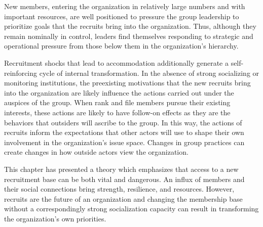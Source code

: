 New members, entering the organization in relatively large numbers and with important resources, are well positioned to pressure the group leadership to prioritize goals that the recruits bring into the organization.  Thus, although they remain nominally in control, leaders find themselves responding to strategic and operational pressure from those below them in the organization's hierarchy. 

Recruitment shocks that lead to accommodation additionally generate a self-reinforcing cycle of internal transformation. In the absence of strong socializing or monitoring institutions, the preexisting motivations that the new recruits bring into the organization are likely influence the actions carried out under the auspices of the group.  When rank and file members pursue their existing interests, these actions are likely to have follow-on effects as they are the behaviors that outsiders will ascribe to the group.  In this way, the actions of recruits inform the expectations that other actors will use to shape their own involvement in the organization's issue space.  Changes in group practices can create changes in how outside actors view the organization.

This chapter has presented a theory which emphasizes that access to a new recruitment base can be both vital and dangerous. An influx of members and their social connections bring strength, resilience, and resources. However, recruits are the future of an organization and changing the membership base without a correspondingly strong socialization capacity can result in transforming the organization's own priorities.